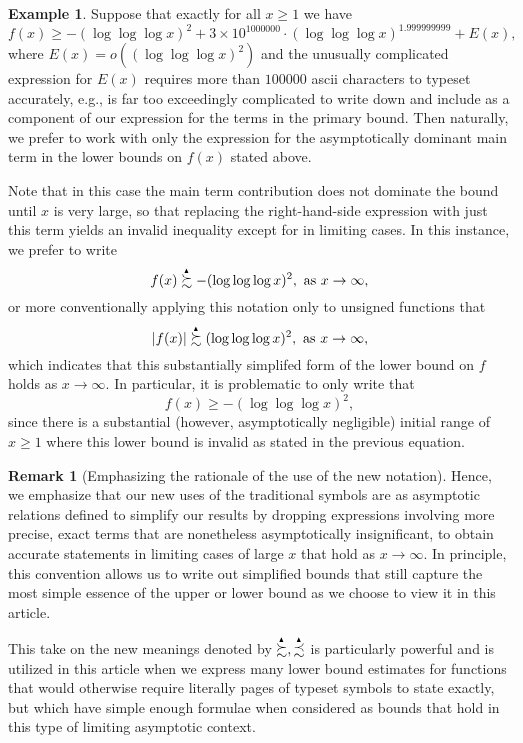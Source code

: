 \documentclass[11pt,reqno,a4letter]{article}
\numberwithin{figure}{section}
\numberwithin{table}{section}
\theoremstyle{plain}
\numberwithin{theorem}{section}
\theoremstyle{definition}
\newtheorem{example}[theorem]{Example}
\newtheorem{remark}[theorem]{Remark}
\newcommand{\SuccSim}[0]{\overset{_{\scriptsize{\blacktriangle}}}{\succsim}}
\newcommand{\PrecSim}[0]{\overset{_{\scriptsize{\blacktriangle}}}{\precsim}}
\begin{document}
\begin{example}
Suppose that exactly for all $x \geq 1$ we have 
\[
f(x) \geq -(\log\log\log x)^2 + 3 \times 10^{1000000} \cdot (\log\log\log x)^{1.999999999} + E(x), 
\]
where $E(x) = o\left((\log\log\log x)^2\right)$ and the unusually complicated expression for $E(x)$ requires 
more than $100000$ ascii characters to typeset accurately, e.g., is far too exceedingly complicated to write down and 
include as a component of our expression for the terms in the primary bound. 
Then naturally, we prefer to work with only the expression
for the asymptotically dominant main term in the lower bounds on $f(x)$ stated above. 

Note that in this case the main term contribution 
does not dominate the bound until $x$ is very large, so that replacing the right-hand-side expression with just this 
term yields an invalid inequality except for in limiting cases. In this instance, we prefer to write 
\[
f(x) \SuccSim -(\log\log\log x)^2, \mathrm{\ as \ } x \rightarrow \infty, 
\]
or more conventionally applying this notation only to unsigned functions that 
\[
|f(x)| \SuccSim (\log\log\log x)^2, \mathrm{\ as \ } x \rightarrow \infty, 
\]
which indicates that this substantially simplifed form of the lower bound on $f$ holds as $x \rightarrow \infty$. 
In particular, it is problematic to only write that 
\[
f(x) \geq -(\log\log\log x)^2, 
\]
since there is a substantial (however, asymptotically negligible) initial range of $x \geq 1$ where this lower bound is 
invalid as stated in the previous equation. 
\end{example} 

\begin{remark}[Emphasizing the rationale of the use of the new notation]
Hence, we emphasize that our new uses of the traditional symbols are as asymptotic 
relations defined to simplify our results by dropping expressions involving more precise, exact terms 
that are nonetheless asymptotically insignificant, to obtain accurate statements 
in limiting cases of large $x$ that hold as $x \rightarrow \infty$. In principle, this convention allows us to 
write out simplified bounds that still capture the most simple 
essence of the upper or lower bound as we choose to view it in this article. 

This take on the new meanings denoted by $\SuccSim,\PrecSim$ is particularly 
powerful and is utilized in this article when we express many lower bound estimates for functions that would 
otherwise require literally pages of typeset symbols to state exactly, but which have simple enough 
formulae when considered as bounds that hold in this type of limiting asymptotic context. 
\end{remark} 
\end{document}
